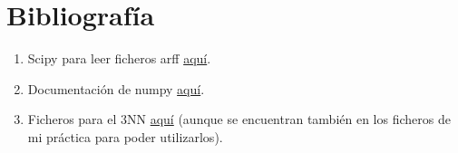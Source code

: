 \documentclass[12pt]{article}
\begin{document}
\newpage

\section{Bibliografía}
\begin{enumerate}
\item Scipy para leer ficheros arff \href{arff http://docs.scipy.org/doc/scipy/reference/generated/scipy.io.arff.loadarff.html}{aquí}.
\item Documentación de numpy \href{http://docs.scipy.org/doc/numpy/user/index.html}{aquí}.
\item Ficheros para el 3NN \href{https://github.com/agarciamontoro/metaheuristics/tree/master/src/knnGPU}{aquí} (aunque se encuentran también en los ficheros de mi práctica para poder utilizarlos).
\end{enumerate}
\end{document}
